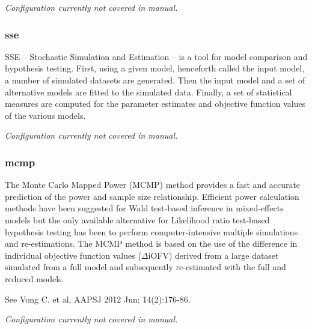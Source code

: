 \documentclass[a4,11pt]{report} \usepackage[pdftex]{graphicx}
\begin{document}
\vspace{10pt}

\noindent \textit{Configuration currently not covered in manual.}

\subsubsection{sse}
SSE – Stochastic Simulation and Estimation – is a tool for model comparison and hypothesis testing.
First, using a given model, henceforth called the input model, a number of simulated datasets are
generated. Then the input model and a set of alternative models are fitted to the simulated data. Finally,
a set of statistical measures are computed for the parameter estimates and objective function values of
the various models.

\vspace{10pt}

\noindent \textit{Configuration currently not covered in manual.}

\subsubsection{mcmp}
The Monte Carlo Mapped Power (MCMP) method provides a fast and
accurate prediction of the power and sample size
relationship. Efficient power calculation methods have been suggested
for Wald test-based inference in mixed-effects models but the only
available alternative for Likelihood ratio test-based hypothesis
testing has been to perform computer-intensive multiple simulations
and re-estimations. The MCMP method is based on the use of the
difference in individual objective function values ($\Delta$iOFV)
derived from a large dataset simulated from a full model and
subsequently re-estimated with the full and reduced models.

\vspace{10pt}

\noindent See Vong C. et al, AAPSJ 2012 Jun; 14(2):176-86.

\vspace{10pt}

\noindent \textit{Configuration currently not covered in manual.}
\end{document}
